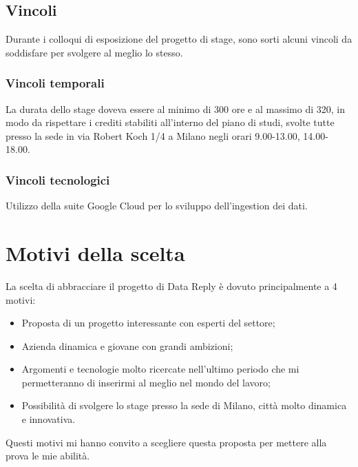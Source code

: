 \subsection{Vincoli}
Durante i colloqui di esposizione del progetto di stage, sono sorti alcuni vincoli da soddisfare per svolgere al meglio lo stesso.\\
\subsubsection{Vincoli temporali}
La durata dello stage doveva essere al minimo di 300 ore e al massimo di 320, in modo da rispettare i crediti stabiliti all'interno del piano di studi, svolte tutte presso la sede in via Robert Koch 1/4 a Milano negli orari 9.00-13.00, 14.00-18.00.
\subsubsection{Vincoli tecnologici}
Utilizzo della suite \gls{Google Cloud} per lo sviluppo dell'ingestion dei dati.
\section{Motivi della scelta}
La scelta di abbracciare il progetto di Data Reply è dovuto principalmente a 4 motivi:
\begin{itemize}
	\item Proposta di un progetto interessante con esperti del settore;
	\item Azienda dinamica e giovane con grandi ambizioni;
	\item Argomenti e tecnologie molto ricercate nell'ultimo periodo che mi permetteranno di inserirmi al meglio nel mondo del lavoro;
	\item Possibilità di svolgere lo stage presso la sede di Milano, città molto dinamica e innovativa.
\end{itemize}
Questi motivi mi hanno convito a scegliere questa proposta per mettere alla prova le mie abilità.